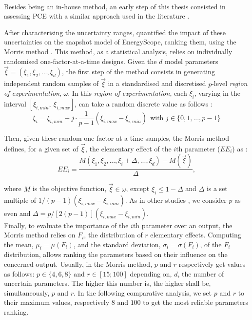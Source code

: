 \\

\noindent
Besides being an in-house method, an early step of this thesis consisted in assessing \gls{PCE} with a similar approach used in the literature \cite{limpens2020impact}. 

After characterising the uncertainty ranges, \citet{Moret2017} quantified the impact of these uncertainties on the snapshot model of EnergyScope,  \ie ranking them, using the Morris method \cite{morris_factorial_1991}.  This method, as a statistical analysis, relies on individually randomised one-factor-at-a-time designs. Given the $d$ model parameters $\vec{\xi}=(\xi_1,\xi_2,...,\xi_d)$, the first step of the method consists in generating independent random samples of $\vec{\xi}$ in a standardised and discretised $p$-level \textit{region of experimentation}, $\omega$. In this \textit{region of experimentation}, each $\xi_i$, varying in the interval $[\xi_{i,min},~\xi_{i,max}]$, can take a random discrete value as follows :
\begin{equation}
  \xi_{i}=\xi_{i,min}+j\cdot\frac{1}{p-1}\left(\xi_{i,max}-\xi_{i,min}\right)~~\text{with }j\in\{0,1,...,p-1\}
\end{equation}

Then, given these random one-factor-at-a-time samples, the Morris method defines, for a given set of $\vec{\xi}$, the elementary effect of the $i$th parameter ($EE_i$) as :
\begin{equation}
  EE_{i}=\frac{M(\xi_1,\xi_2,...,\xi_i+\Delta,...,\xi_d)-M(\vec{\xi})}{\Delta},
\end{equation}

\noindent where $M$ is the objective function, $\vec{\xi}\in\omega$, except $\xi_i\leq1-\Delta$ and $\Delta$ is a set multiple of $1/(p-1)\left(\xi_{i,max}-\xi_{i,min}\right)$. As in other studies \cite{Sin2009,Moret2017,Moret2017PhDThesis}, we consider $p$ as even and $\Delta=p/[2(p-1)]\left(\xi_{i,max}-\xi_{i,min}\right)$.\\

Finally, to evaluate the importance of the $i$th parameter over an output, the Morris method relies on $F_i$, the distribution of $r$ elementary effects. Computing the mean, $\mu_{i}=\mu(F_{i})$, and the standard deviation, $\sigma_{i}=\sigma(F_{i})$, of the $F_{i}$ distribution, allows ranking the parameters based on their influence on the concerned output. Usually, in the Morris method, $p$ and $r$ respectively get values as follows: $p\in \{4,6,8\}$ and $r\in [15;100]$ depending on, $d$, the number of uncertain parameters. The higher this number is,  the higher shall be, simultaneously, $p$ and $r$. In the following comparative analysis, we set $p$ and $r$ to their maximum values, respectively $8$ and $100$ to get the most reliable parameters ranking.\\

